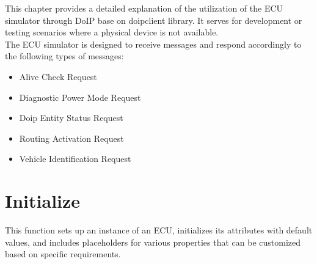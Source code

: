 




\label{ecusimulator}

This chapter provides a detailed explanation of the utilization of the ECU simulator through DoIP base on doipclient library. It serves for development or testing scenarios where a physical device is not available.
\\The ECU simulator is designed to receive messages and respond accordingly to the following types of messages:

\begin{itemize}
   \item Alive Check Request
   \item Diagnostic Power Mode Request
   \item Doip Entity Status Request
   \item Routing Activation Request
   \item Vehicle Identification Request
\end{itemize}

\section{Initialize}

This function sets up an instance of an ECU, initializes its attributes with default values, and includes placeholders for various properties that can be customized based on specific requirements.


